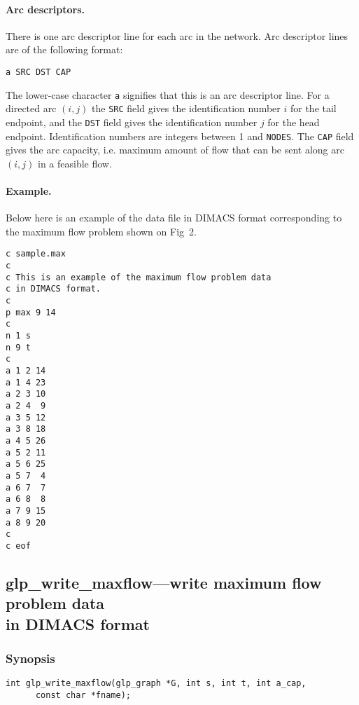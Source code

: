 \paragraph{Arc descriptors.} There is one arc descriptor line for each
arc in the network. Arc descriptor lines are of the following format:

\begin{verbatim}
a SRC DST CAP
\end{verbatim}

\noindent
The lower-case character \verb|a| signifies that this is an arc
descriptor line. For a directed arc $(i,j)$ the \verb|SRC| field gives
the identification number $i$ for the tail endpoint, and the \verb|DST|
field gives the identification number $j$ for the head endpoint.
Identification numbers are integers between 1 and \verb|NODES|. The
\verb|CAP| field gives the arc capacity, i.e. maximum amount of flow
that can be sent along arc $(i,j)$ in a feasible flow.

\newpage

\paragraph{Example.} Below here is an example of the data file in
DIMACS format corresponding to the maximum flow problem shown on Fig~2.

\begin{verbatim}
c sample.max
c
c This is an example of the maximum flow problem data
c in DIMACS format.
c
p max 9 14
c
n 1 s
n 9 t
c
a 1 2 14
a 1 4 23
a 2 3 10
a 2 4  9
a 3 5 12
a 3 8 18
a 4 5 26
a 5 2 11
a 5 6 25
a 5 7  4
a 6 7  7
a 6 8  8
a 7 9 15
a 8 9 20
c
c eof
\end{verbatim}

\newpage

\subsection{glp\_write\_maxflow---write maximum flow problem data\\
in DIMACS format}

\subsubsection*{Synopsis}

\begin{verbatim}
int glp_write_maxflow(glp_graph *G, int s, int t, int a_cap,
      const char *fname);
\end{verbatim}

